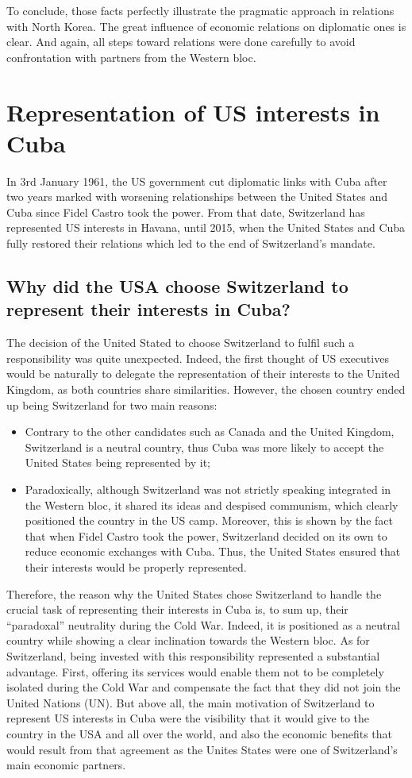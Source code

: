 \documentclass[a4paper]{article}
\begin{document}
To conclude, those facts perfectly illustrate the pragmatic approach in relations with North Korea. The great influence of economic relations on diplomatic ones is clear. And again, all steps toward relations were done carefully to avoid confrontation with partners from the Western bloc.
\clearpage
\section{Representation of US interests in Cuba}
In 3rd January 1961, the US government cut diplomatic links with Cuba after two years marked with worsening relationships between the United States and Cuba since Fidel Castro took the power. 
From that date, Switzerland has represented US interests in Havana, until 2015, when the United States and Cuba fully restored their relations which led to the end of Switzerland’s mandate. 
\subsection{Why did the USA choose Switzerland to represent their interests in Cuba?}
The decision of the United Stated to choose Switzerland to fulfil such a responsibility was quite unexpected. Indeed, the first thought of US executives would be naturally to delegate the representation of their interests to the United Kingdom, as both countries share similarities. 
However, the chosen country ended up being Switzerland for two main reasons:
\begin{itemize}
\item Contrary to the other candidates such as Canada and the United Kingdom, Switzerland is a neutral country, thus Cuba was more likely to accept the United States being represented by it;
\item Paradoxically, although Switzerland was not strictly speaking integrated in the Western bloc, it shared its ideas and despised communism, which clearly positioned the country in the US camp. Moreover, this is shown by the fact that when Fidel Castro took the power, Switzerland decided on its own to reduce economic exchanges with Cuba. Thus, the United States ensured that their interests would be properly represented. 
\end{itemize}
Therefore, the reason why the United States chose Switzerland to handle the crucial task of representing their interests in Cuba is, to sum up, their “paradoxal” neutrality during the Cold War. Indeed, it is positioned as a neutral country while showing a clear inclination towards the Western bloc. 
As for Switzerland, being invested with this responsibility represented a substantial advantage. First, offering its services would enable them not to be completely isolated during the Cold War and compensate the fact that they did not join the United Nations (UN). But above all, the main motivation of Switzerland to represent US interests in Cuba were the visibility that it would give to the country in the USA and all over the world, and also the economic benefits that would result from that agreement as the Unites States were one of Switzerland’s main economic partners. 
\end{document}
